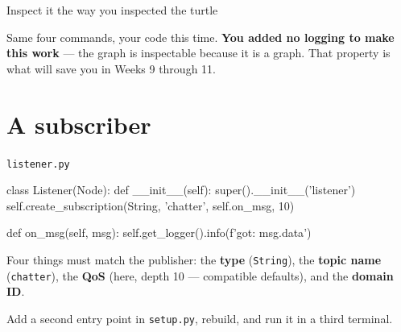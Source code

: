 \documentclass[aspectratio=169]{beamer}
\begin{document}
\begin{frame}[fragile]{Inspect it the way you inspected the turtle}

  \vspace{0.3em}
  \footnotesize
  Same four commands, your code this time. \textbf{You added no logging to make this work} ---
  the graph is inspectable because it is a graph. That property is what will save you in
  Weeks 9 through 11.
\end{frame}

\section{A subscriber}

\begin{frame}[fragile]{\texttt{listener.py}}
  \begin{pycodes}
class Listener(Node):
    def __init__(self):
        super().__init__('listener')
        self.create_subscription(String, 'chatter', self.on_msg, 10)

    def on_msg(self, msg):
        self.get_logger().info(f'got: {msg.data}')
  \end{pycodes}

  \vspace{0.5em}
  \small
  Four things must match the publisher: the \textbf{type} (\texttt{String}), the
  \textbf{topic name} (\texttt{chatter}), the \textbf{QoS} (here, depth 10 --- compatible
  defaults), and the \textbf{domain ID}.

  \vspace{0.4em}
  \footnotesize
  Add a second entry point in \texttt{setup.py}, rebuild, and run it in a third terminal.
\end{frame}
\end{document}
